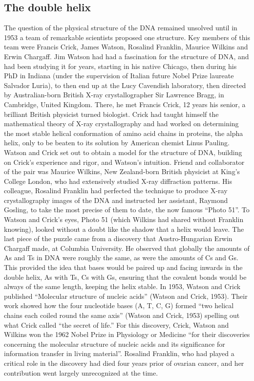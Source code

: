 \subsection{The double helix} %

The question of the physical structure of the DNA remained unsolved until in 1953 a team of remarkable scientists proposed one structure. 
Key members of this team were Francis Crick, James Watson, Rosalind Franklin, Maurice Wilkins and Erwin Chargaff. 
Jim Watson had had a fascination for the structure of DNA, and had been studying it for years, starting in his native Chicago, then during his PhD in Indiana (under the supervision of Italian future Nobel Prize laureate Salvador Luria), to then end up at the Lucy Cavendish laboratory, then directed by Australian-born British X-ray crystallographer Sir Lawrence Bragg, in Cambridge, United Kingdom. 
There, he met Francis Crick, 12 years his senior, a brilliant British physicist turned biologist. 
Crick had taught himself the mathematical theory of X-ray crystallography and had worked on determining the most stable helical conformation of amino acid chains in proteins, the alpha helix, only to be beaten to its solution by American chemist Linus Pauling. 
Watson and Crick set out to obtain a model for the structure of DNA, building on Crick’s experience and rigor, and Watson’s intuition. 
Friend and collaborator of the pair was Maurice Wilkins, New Zealand-born British physicist at King’s College London, who had extensively studied X-ray diffraction patterns. 
His colleague, Rosalind Franklin had perfected the technique to produce X-ray crystallography images of the DNA and instructed her assistant, Raymond Gosling, to take the most precise of them to date, the now famous “Photo 51”. 
To Watson and Crick’s eyes, Photo 51 (which Wilkins had shared without Franklin knowing), looked without a doubt like the shadow that a helix would leave. The last piece of the puzzle came from a discovery that Austro-Hungarian Erwin Chargaff made, at Columbia University. He observed that globally the amounts of As and Ts in DNA were roughly the same, as were the amounts of Cs and Gs. 
This provided the idea that bases would be paired up and facing inwards in the double helix, As with Ts, Cs with Gs, ensuring that the covalent bonds would be always of the same length, keeping the helix stable. 
In 1953, Watson and Crick published “Molecular structure of nucleic acids” (Watson and Crick, 1953). 
Their work showed how the four nucleotide bases (A, T, C, G) formed “two helical chains each coiled round the same axis” (Watson and Crick, 1953) spelling out what Crick called “the secret of life.” 
For this discovery, Crick, Watson and Wilkins won the 1962 Nobel Prize in Physiology or Medicine “for their discoveries concerning the molecular structure of nucleic acids and its significance for information transfer in living material”. 
Rosalind Franklin, who had played a critical role in the discovery had died four years prior of ovarian cancer, and her contribution went largely unrecognized at the time.


